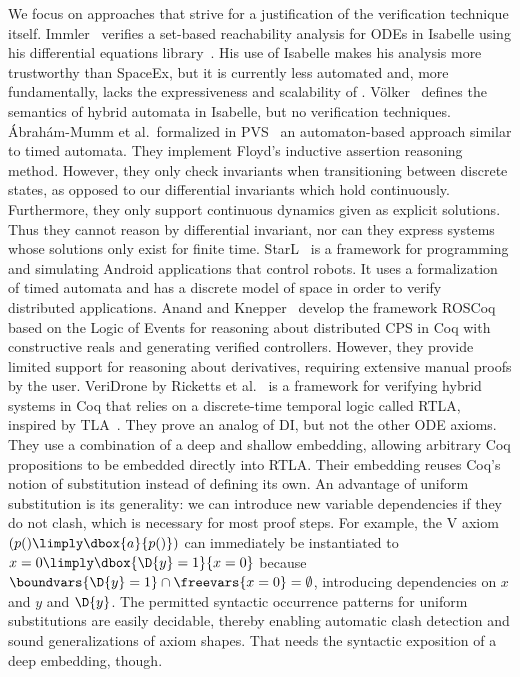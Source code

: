 \documentclass[12pt]{cmuthesis}
\theoremstyle{definition}
\theoremstyle{remark}
\begin{document}
We focus on approaches that strive for a justification of the verification technique itself.
Immler~\cite{DBLP:conf/tacas/Immler15} verifies a set-based reachability analysis for ODEs in Isabelle using his differential equations library~\cite{DBLP:conf/itp/ImmlerT16}.
His use of Isabelle makes his analysis more trustworthy than SpaceEx, but it is currently less automated and, more fundamentally, lacks the expressiveness and scalability of \dL.
%
V\"{o}lker~\cite{Volker:2000} defines the semantics of hybrid automata in Isabelle, but no verification techniques.
\'{A}brah\'{a}m-Mumm et al.\
formalized in PVS~\cite{Mumm+Steffen+Hannemann:iceccs:2001} an
automaton-based approach similar to timed automata. 
They implement Floyd's inductive assertion reasoning method.
However, they only check invariants when transitioning between discrete states, as opposed to our differential invariants which hold continuously.
Furthermore, they only support continuous dynamics given as explicit solutions.
Thus they cannot reason by differential invariant, nor can they express systems whose solutions only exist for finite time.
%
StarL~\cite{Lin+Mitra:lctrts:2015} is a framework for programming and simulating Android applications that control robots.
It uses a formalization of timed automata and has a discrete model of space in order to verify distributed applications.
%
Anand and Knepper~\cite{Anand+Knepper:itp:2015} develop the framework ROSCoq based on the Logic of Events for reasoning about distributed CPS in Coq with constructive reals and generating verified controllers.
However, they provide limited support for reasoning about derivatives, requiring extensive manual proofs by the user.
%
VeriDrone by Ricketts et al.~\cite{Ricketts:memcode:2015} is a
framework for verifying hybrid systems in Coq that relies on a
discrete-time temporal logic called RTLA, inspired by
TLA~\cite{Lamport:hybrid:1992}.
%
They prove an analog of DI, but not the other ODE axioms.
They use a combination of a deep and shallow embedding, allowing
arbitrary Coq propositions to be embedded directly into RTLA.
Their embedding reuses Coq's notion of substitution instead of defining its own.
An advantage of uniform substitution is its generality: we can introduce new variable dependencies if they do not clash,
which is necessary for most proof steps.
For example, the V axiom $(p() \limply \dbox{a}{p()})$ can immediately be instantiated to $x=0 \limply \dbox{\D{y}=1}{x=0}$ 
because $\boundvars{\D{y}=1} \cap \freevars{x=0} = \emptyset$, introducing dependencies on $x$ and $y$ and $\D{y}$.
The permitted syntactic occurrence patterns for uniform substitutions are easily decidable, thereby enabling automatic clash detection and sound generalizations of axiom shapes.
That needs the syntactic exposition of a deep embedding, though.
\end{document}
